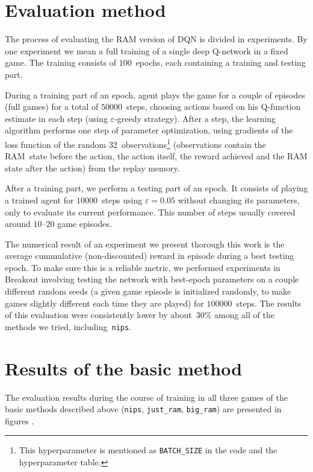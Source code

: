 \section{Evaluation method}
The process of evaluating the RAM version of DQN is divided in experiments. By one experiment we mean a full training of a single deep Q-network in a fixed game. The training consists of $100$~epochs, each containing a training and testing part.

During a training part of an epoch, agent plays the game for a couple of episodes (full games) for a total of $50000$~steps, choosing actions based on his Q-function estimate in each step (using $\varepsilon$-greedy strategy). After a step, the learning algorithm performs one step of parameter optimization, using gradients of the loss function of the random $32$~observations\footnote{This hyperparameter is mentioned as \texttt{BATCH\_SIZE} in the code and the hyperparameter table.} (observations contain the RAM~state before the action, the action itself, the reward achieved and the RAM state after the action) from the replay memory.

After a training part, we perform a testing part of an epoch. It consists of playing a trained agent for $10000$~steps using $\varepsilon=0.05$ without changing its parameters, only to evaluate its current performance. This number of steps usually covered around $10$--$20$ game episodes.

The numerical result of an experiment we present thorough this work is the average cummulative (non-discounted) reward in episode during a best testing epoch. To make sure this is a reliable metric, we performed experiments in Breakout involving testing the network with best-epoch parameters on a couple different random seeds (a given game episode is initialized randomly, to make games slightly different each time they are played) for $100000$~steps. The results of this evaluation were consistently lower by about~$30\%$ among all of the methods we tried, including~\texttt{nips}.

\section{Results of the basic method}
The evaluation results during the course of training in all three games of the basic methods described above (\texttt{nips}, \texttt{just\_ram}, \texttt{big\_ram}) are presented in figures .

